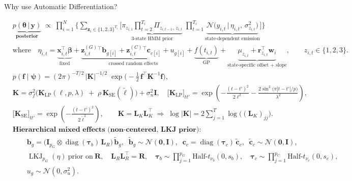 \documentclass[dvipsnames]{beamer}
\begin{document}
\begin{frame}{Why use Automatic Differentiation?}

\tiny
\begin{align*}
&\underbrace{p\!\left(
\boldsymbol{\theta} \,\big|\, \mathbf y
\right)}_{\textbf{posterior}}
\;\propto\;
\prod_{i=1}^{N}
\Bigg\{
\sum_{\mathbf z_i \in \{1,2,3\}^{T_i}}
\!\Bigg[
\underbrace{\pi_{z_{i,1}}\prod_{t=2}^{T_i}\Pi_{z_{i,t-1},\,z_{i,t}}}_{\text{3-state HMM prior}}
\;
\prod_{t=1}^{T_i}
\underbrace{\mathcal N\!\Big(
y_{i,t}\,\Big|\,\eta_{i,t},\,\sigma_{z_{i,t}}^{2}
\Big)}_{\text{state-dependent emission}}
\Bigg]
\Bigg\}
\\[-2pt]
&\text{where}\quad
\eta_{i,t}
=\underbrace{\mathbf x_{i,t}^{\!\top}\boldsymbol\beta}_{\text{fixed}}
+\underbrace{\mathbf z^{(G)}_{i,t}{}^{\!\top}\mathbf b_{g[i]}
+\mathbf z^{(C)}_{i,t}{}^{\!\top}\mathbf c_{c[i]}
+u_{g[i]}}_{\text{crossed random effects}}
+\underbrace{f(t_{i,t})}_{\text{GP}}
+\underbrace{\mu_{z_{i,t}}
+\mathbf r_{z_{i,t}}^{\!\top}\mathbf w_i}_{\text{state-specific offset + slope}}
,\qquad z_{i,t}\in\{1,2,3\}.
\\[4pt]
&
p(\mathbf f\mid\boldsymbol\psi)
=
(2\pi)^{-T/2}\,|\mathbf K|^{-1/2}\;
\exp\!\Big(-\tfrac12\,\mathbf f^{\!\top}\mathbf K^{-1}\mathbf f\Big),
\\[-2pt]
&
\mathbf K
=\sigma_f^{2}\Big(\mathbf K_{\text{LP}}(\ell,p,\lambda)\;+\;\rho\,\mathbf K_{\text{SE}}(\tilde\ell)\Big)
+\sigma_n^{2}\mathbf I,\quad
\big[\mathbf K_{\text{LP}}\big]_{t t'}
=\exp\!\left(
-\frac{(t-t')^{2}}{2\ell^{2}}
-\frac{2\sin^{2}\!\big(\pi|t-t'|/p\big)}{\lambda^{2}}
\right),
\\[-2pt]
&
\big[\mathbf K_{\text{SE}}\big]_{t t'}
=
\exp\!\left(-\frac{(t-t')^{2}}{2\tilde\ell^{2}}\right),
\qquad
\mathbf K=\mathbf L_K\mathbf L_K^{\!\top}
\;\Rightarrow\;
\log|\mathbf K|=2\sum_{j=1}^{T}\log \big((\mathbf L_K)_{jj}\big).
\\[6pt]
&\textbf{Hierarchical mixed effects (non-centered, LKJ prior):}
\\[-2pt]
&\qquad
\mathbf b_{g}=\big(\mathbf I_{p_G}\otimes\operatorname{diag}(\boldsymbol\tau_b)\,\mathbf L_R\big)\,\tilde{\mathbf b}_{g},
\;\;
\tilde{\mathbf b}_{g}\sim\mathcal N(\mathbf 0,\mathbf I),
\;\;
\mathbf c_{c}=\operatorname{diag}(\boldsymbol\tau_c)\,\tilde{\mathbf c}_{c},
\;\;
\tilde{\mathbf c}_{c}\sim\mathcal N(\mathbf 0,\mathbf I),
\\[-2pt]
&\qquad
\operatorname{LKJ}_{p_G}(\eta)\ \text{prior on}\ \mathbf R,\quad
\mathbf L_R\mathbf L_R^{\!\top}=\mathbf R,
\quad
\boldsymbol\tau_b\sim\prod_{j=1}^{p_G}\text{Half-}t_{\nu_b}(0,s_b),
\quad
\boldsymbol\tau_c\sim\prod_{j=1}^{p_C}\text{Half-}t_{\nu_c}(0,s_c),
\\[-2pt]
&\qquad
u_g\sim\mathcal N(0,\sigma_u^2).
\end{align*}


\end{frame}
\end{document}
